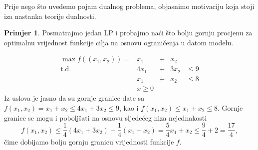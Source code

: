 \documentclass[b5paper, utf8, 11pt, colorlinks]{book}
\theoremstyle{definition}
\newtheorem{primjer}{Primjer}[chapter]
\begin{document}
Prije nego što uvedemo pojam dualnog problema, objasnimo motivaciju koja stoji iza nastanka teorije dualnosti.

\begin{primjer}  
	Posmatrajmo jedan LP i probajmo naći što bolju gornju procjenu za optimalnu vrijednost  funkcije cilja na osnovu ograničenja u datom modelu.
\end{primjer}

$$ 
\begin{array}{lllll}  
	\max                f((x_1,x_2))=  &x_1 &+& x_2   &               \\
	\mbox{t.d.}  &4x_1 & +&3 x_2 & \leq 9        \\
	&x_1 &+ &x_2   &  \leq 8       \\
	&x \geq 0  &  &     &      
\end{array}
$$
Iz uslova je jasno da su gornje granice date sa $f(x_1,x_2) = x_1 + x_2 \leq 4 x_1 + 3 x_2 \leq 9$, kao i 
$f(x_1,x_2) \leq x_1 + x_2 \leq 8$. Gornje granice se mogu i poboljšati na osnovu sljedećeg niza nejednakosti
$$f(x_1,x_2) \leq \frac{1}{4}(  4 x_1 + 3 x_2  ) + \frac{1}{4}(    x_1 +   x_2 ) = \frac{5}{4}x_1 + x_2 \leq  \frac{9}{4} + 2 = \frac{17}{4},$$ 
čime dobijamo bolju gornju granicu vrijednosti funkcije $f$. 
\end{document}
